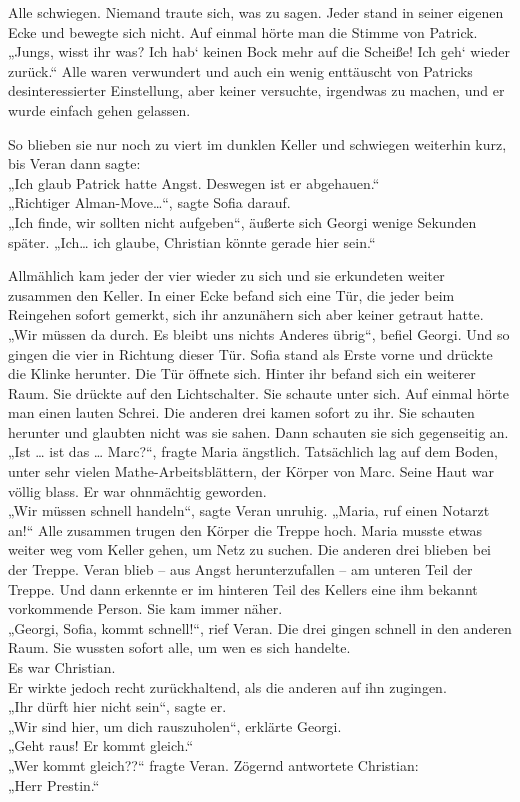 \documentclass[oneside]{memoir}
\begin{document}
Alle schwiegen. Niemand traute sich, was zu sagen. Jeder stand in seiner eigenen Ecke und bewegte sich nicht.
Auf einmal hörte man die Stimme von Patrick. \\
„Jungs, wisst ihr was? Ich hab‘ keinen Bock mehr auf die Scheiße! 
Ich geh‘ wieder zurück.“
Alle waren verwundert und auch ein wenig enttäuscht von Patricks desinteressierter Einstellung, aber keiner versuchte, irgendwas zu machen, und er wurde einfach gehen gelassen.

So blieben sie nur noch zu viert im dunklen Keller und schwiegen weiterhin kurz, bis Veran dann sagte:  \\
„Ich glaub Patrick hatte Angst. Deswegen ist er abgehauen.“ \\
„Richtiger Alman-Move\ldots“, sagte Sofia darauf. \\
„Ich finde, wir sollten nicht aufgeben“, äußerte sich Georgi wenige Sekunden später. „Ich\ldots{} ich glaube, Christian könnte gerade hier sein.“

Allmählich kam jeder der vier wieder zu sich und sie erkundeten weiter zusammen den Keller.
In einer Ecke befand sich eine Tür, die jeder beim Reingehen sofort gemerkt, sich ihr anzunähern sich aber keiner getraut hatte.  \\
„Wir müssen da durch. Es bleibt uns nichts Anderes übrig“, befiel Georgi.
Und so gingen die vier in Richtung dieser Tür.
Sofia stand als Erste vorne und drückte die Klinke herunter. Die Tür öffnete sich. Hinter ihr befand sich ein weiterer Raum. Sie drückte auf den Lichtschalter. Sie schaute unter sich.
Auf einmal hörte man einen lauten Schrei.
Die anderen drei kamen sofort zu ihr. Sie schauten herunter und glaubten nicht was sie sahen. Dann schauten sie sich gegenseitig an. \\
„Ist \ldots{} ist das \ldots{} Marc?“, fragte Maria ängstlich.
Tatsächlich lag auf dem Boden, unter sehr vielen Mathe-Arbeitsblättern,
der Körper von Marc. Seine Haut war völlig blass. Er war ohnmächtig geworden. \\
„Wir müssen schnell handeln“, sagte Veran unruhig. „Maria, ruf einen Notarzt an!“
Alle zusammen trugen den Körper die Treppe hoch. Maria musste etwas weiter weg vom Keller gehen, um Netz zu suchen. Die anderen drei blieben bei der Treppe. Veran blieb -- aus Angst herunterzufallen -- am unteren Teil der Treppe.
Und dann erkennte er im hinteren Teil des Kellers eine ihm bekannt vorkommende Person. Sie kam immer näher. \\
„Georgi, Sofia, kommt schnell!“, rief Veran. Die drei gingen schnell in den anderen Raum. Sie wussten sofort alle, um wen es sich handelte. \\
Es war Christian. \\
Er wirkte jedoch recht zurückhaltend, als die anderen auf ihn zugingen. \\
„Ihr dürft hier nicht sein“, sagte er. \\
„Wir sind hier, um dich rauszuholen“, erklärte Georgi. \\
„Geht raus! Er kommt gleich.“ \\
„Wer kommt gleich??“ fragte Veran.
Zögernd antwortete Christian: \\
„Herr Prestin.“
\end{document}
